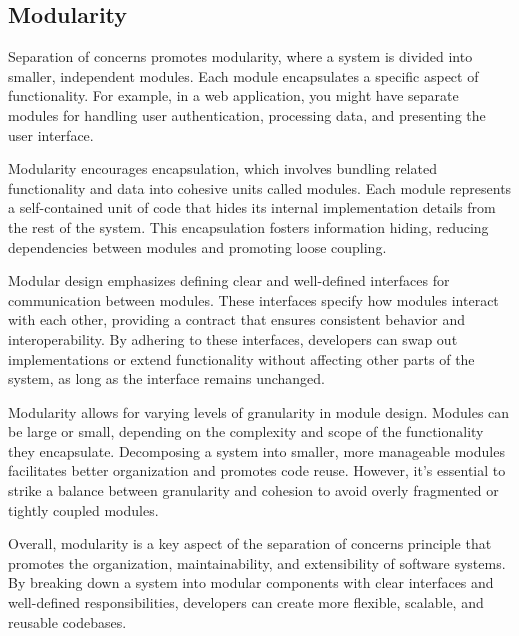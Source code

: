\subsection{Modularity}
Separation of concerns promotes modularity, where a system is divided into smaller, independent modules.
Each module encapsulates a specific aspect of functionality.
For example, in a web application, you might have separate modules for handling user authentication, processing data, and presenting the user interface.
\par
Modularity encourages encapsulation, which involves bundling related functionality and data into cohesive units called modules.
Each module represents a self-contained unit of code that hides its internal implementation details from the rest of the system.
This encapsulation fosters information hiding, reducing dependencies between modules and promoting loose coupling.
\par
Modular design emphasizes defining clear and well-defined interfaces for communication between modules.
These interfaces specify how modules interact with each other, providing a contract that ensures consistent behavior and interoperability.
By adhering to these interfaces, developers can swap out implementations or extend functionality without affecting other parts of the system, as long as the interface remains unchanged.
\par
Modularity allows for varying levels of granularity in module design.
Modules can be large or small, depending on the complexity and scope of the functionality they encapsulate.
Decomposing a system into smaller, more manageable modules facilitates better organization and promotes code reuse.
However, it's essential to strike a balance between granularity and cohesion to avoid overly fragmented or tightly coupled modules.
\par
Overall, modularity is a key aspect of the separation of concerns principle that promotes the organization, maintainability, and extensibility of software systems.
By breaking down a system into modular components with clear interfaces and well-defined responsibilities, developers can create more flexible, scalable, and reusable codebases.


